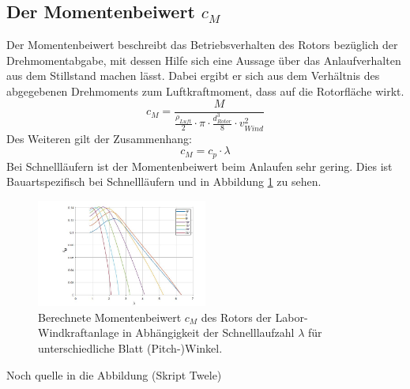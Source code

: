 \subsection{Der Momentenbeiwert \texorpdfstring{$c_M$}{}}
Der Momentenbeiwert beschreibt das Betriebsverhalten des Rotors bezüglich der Drehmomentabgabe, mit dessen Hilfe sich eine Aussage über das Anlaufverhalten aus dem Stillstand machen lässt. Dabei ergibt er sich aus dem Verhältnis des abgegebenen Drehmoments zum Luftkraftmoment, dass auf die Rotorfläche wirkt.
\begin{equation}
  c_{M}= \frac{M}{ \frac{\rho_{Luft}}{2}\cdot \pi \cdot \frac{d^3_{Rotor}}{8} \cdot v^2_{Wind} }
    \label{eq:Momentenbeiwert_cm}
\end{equation}
Des Weiteren gilt der Zusammenhang:
\begin{equation}
  c_{M}= c_{p} \cdot \lambda
    \label{eq:Momentenbeiwert_cm2}
\end{equation}
Bei Schnellläufern ist der Momentenbeiwert beim Anlaufen sehr gering. Dies ist Bauartspezifisch bei Schnellläufern und in Abbildung \ref{fig:cmzulambda} zu sehen. 
\begin{figure}[h!]
    \centering
    \includegraphics[width=0.5\textwidth]{Abbildungen/cm.jpg}
    \caption{Berechnete Momentenbeiwert $c_{M}$ des Rotors der Labor-Windkraftanlage in Abhängigkeit der Schnelllaufzahl $\lambda$ für unterschiedliche Blatt (Pitch-)Winkel. }
    \label{fig:cmzulambda}
\end{figure}
Noch quelle in die Abbildung (Skript Twele)


